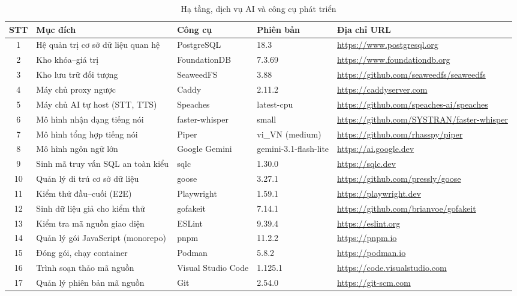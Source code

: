 \documentclass[../DoAn.tex]{subfiles}
\begin{document}
\begin{table}[H]
\centering
\small
\begin{tabular}{|c|p{3.2cm}|p{2.5cm}|p{2cm}|p{3.3cm}|}
\hline
\textbf{STT} & \textbf{Mục đích} & \textbf{Công cụ} & \textbf{Phiên bản} & \textbf{Địa chỉ URL} \\ \hline
1 & Hệ quản trị cơ sở dữ liệu quan hệ & PostgreSQL & 18.3 & \url{https://www.postgresql.org} \\ \hline
2 & Kho khóa--giá trị & FoundationDB & 7.3.69 & \url{https://www.foundationdb.org} \\ \hline
3 & Kho lưu trữ đối tượng & SeaweedFS & 3.88 & \url{https://github.com/seaweedfs/seaweedfs} \\ \hline
4 & Máy chủ proxy ngược & Caddy & 2.11.2 & \url{https://caddyserver.com} \\ \hline
5 & Máy chủ AI tự host (STT, TTS) & Speaches & latest-cpu & \url{https://github.com/speaches-ai/speaches} \\ \hline
6 & Mô hình nhận dạng tiếng nói & faster-whisper & small & \url{https://github.com/SYSTRAN/faster-whisper} \\ \hline
7 & Mô hình tổng hợp tiếng nói & Piper & vi\_VN (medium) & \url{https://github.com/rhasspy/piper} \\ \hline
8 & Mô hình ngôn ngữ lớn & Google Gemini & gemini-3.1-flash-lite & \url{https://ai.google.dev} \\ \hline
9 & Sinh mã truy vấn SQL an toàn kiểu & sqlc & 1.30.0 & \url{https://sqlc.dev} \\ \hline
10 & Quản lý di trú cơ sở dữ liệu & goose & 3.27.1 & \url{https://github.com/pressly/goose} \\ \hline
11 & Kiểm thử đầu--cuối (E2E) & Playwright & 1.59.1 & \url{https://playwright.dev} \\ \hline
12 & Sinh dữ liệu giả cho kiểm thử & gofakeit & 7.14.1 & \url{https://github.com/brianvoe/gofakeit} \\ \hline
13 & Kiểm tra mã nguồn giao diện & ESLint & 9.39.4 & \url{https://eslint.org} \\ \hline
14 & Quản lý gói JavaScript (monorepo) & pnpm & 11.2.2 & \url{https://pnpm.io} \\ \hline
15 & Đóng gói, chạy container & Podman & 5.8.2 & \url{https://podman.io} \\ \hline
16 & Trình soạn thảo mã nguồn & Visual Studio Code & 1.125.1 & \url{https://code.visualstudio.com} \\ \hline
17 & Quản lý phiên bản mã nguồn & Git & 2.54.0 & \url{https://git-scm.com} \\ \hline
\end{tabular}
\caption{Hạ tầng, dịch vụ AI và công cụ phát triển}
\label{tbl:tools3}
\end{table}
\end{document}
